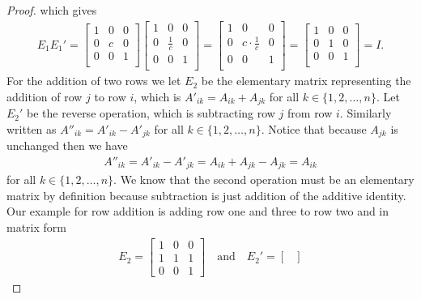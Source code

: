 \documentclass{article}
\begin{document}
\begin{flushleft}
\begin{proof}
			which gives
			\begin{align*}
				E_1 E_1' = \begin{bmatrix}
					1 & 0 & 0 \\
					0 & c & 0 \\
					0 & 0 & 1 \\
				\end{bmatrix}
				\begin{bmatrix}
					1 & 0 & 0 \\
					0 & \frac{1}{c} & 0 \\
					0 & 0 & 1 \\
				\end{bmatrix} = 
				\begin{bmatrix}
					1 & 0 & 0 \\
					0 & c \cdot \frac{1}{c} & 0 \\
					0 & 0 & 1 \\
				\end{bmatrix} = 
				\begin{bmatrix}
					1 & 0 & 0 \\
					0 & 1 & 0 \\
					0 & 0 & 1 \\
				\end{bmatrix} = I.
			\end{align*}
			For the addition of two rows we let $E_2$ be the elementary matrix representing the addition of row $j$ to row $i$, which is $A'_{ik} = A_{ik} + A_{jk}$ for all $k \in \{ 1, 2, \ldots, n \}$. Let $E_2'$ be the reverse operation, which is subtracting row $j$ from row $i$. Similarly written as $A''_{ik} = A'_{ik} - A'_{jk}$ for all $k \in \{ 1, 2, \ldots, n \}$. Notice that because $A_{jk}$ is unchanged then we have
			\begin{align*}
				A''_{ik} = A'_{ik} - A'_{jk} = A_{ik} + A_{jk} - A_{jk} = A_{ik}
			\end{align*}
			for all $k \in \{ 1, 2, \ldots, n \}$. We know that the second operation must be an elementary matrix by definition because subtraction is just addition of the additive identity. Our example for row addition is adding row one and three to row two and in matrix form
			\begin{align*}
				E_2 = \begin{bmatrix}
					1 & 0 & 0 \\
					1 & 1 & 1 \\ 
					0 & 0 & 1
				\end{bmatrix} \quad \text{and} \quad
				E_2' = \begin{bmatrix}

\end{bmatrix}
\end{align*}
\end{proof}
\end{flushleft}
\end{document}
